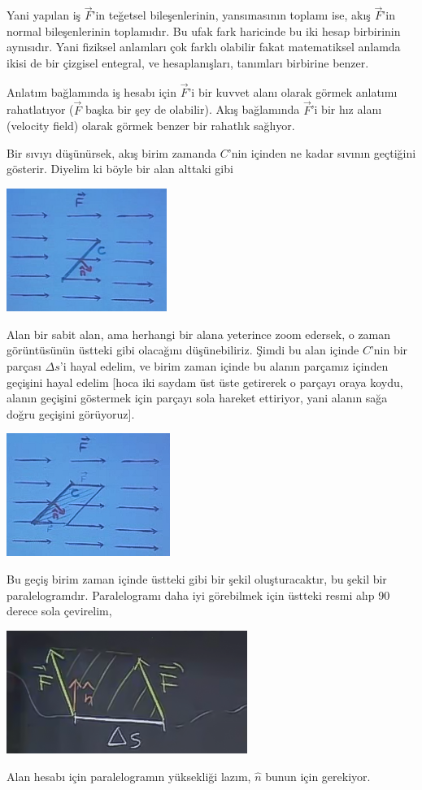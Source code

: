 \documentclass[12pt,fleqn]{article}\usepackage{../../common}
\begin{document}
Yani yapılan iş $\vec{F}$'in teğetsel bileşenlerinin, yansımasının toplamı
ise, akış $\vec{F}$'in normal bileşenlerinin toplamıdır. Bu ufak fark
haricinde bu iki hesap birbirinin aynısıdır. Yani fiziksel anlamları çok
farklı olabilir fakat matematiksel anlamda ikisi de bir çizgisel entegral,
ve hesaplanışları, tanımları birbirine benzer. 

Anlatım bağlamında iş hesabı için $\vec{F}$'i bir kuvvet alanı olarak görmek
anlatımı rahatlatıyor ($\vec{F}$ başka bir şey de olabilir). Akış
bağlamında $\vec{F}$'i bir hız alanı (velocity field) olarak görmek
benzer bir rahatlık sağlıyor. 

Bir sıvıyı düşünürsek, akış birim zamanda $C$'nin içinden ne kadar sıvının
geçtiğini gösterir. Diyelim ki böyle bir alan alttaki gibi
\begin{center}
\includegraphics[height=4cm]{23_3.png}
\end{center}
Alan bir sabit alan, ama herhangi bir alana yeterince zoom edersek, o zaman
görüntüsünün üstteki gibi olacağını düşünebiliriz. Şimdi bu alan içinde
$C$'nin bir parçası $\Delta s$'i hayal edelim, ve birim zaman içinde bu
alanın parçamız içinden geçişini hayal edelim [hoca iki saydam üst üste
getirerek o parçayı oraya koydu, alanın geçişini göstermek için parçayı
sola hareket ettiriyor, yani alanın sağa doğru geçişini görüyoruz].
\begin{center}
\includegraphics[height=4cm]{23_4.png}
\end{center}
Bu geçiş birim zaman içinde üstteki gibi bir şekil oluşturacaktır, bu
şekil bir paralelogramdır. Paralelogramı daha iyi görebilmek için üstteki
resmi alıp 90 derece sola çevirelim, 
\begin{center}
\includegraphics[height=4cm]{23_5.png}
\end{center}
Alan hesabı için paralelogramın yüksekliği lazım, $\hat{n}$ bunun için
gerekiyor. 
\end{document}
